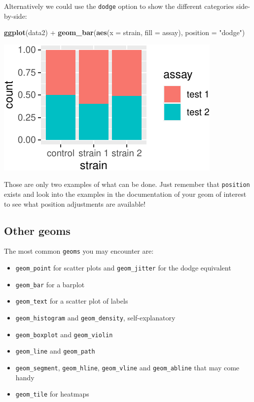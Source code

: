 \documentclass[]{book}
\newenvironment{Shaded}{}{}
\newcommand{\DataTypeTok}[1]{\textcolor[rgb]{0.56,0.13,0.00}{#1}}
\newcommand{\KeywordTok}[1]{\textcolor[rgb]{0.00,0.44,0.13}{\textbf{#1}}}
\newcommand{\NormalTok}[1]{#1}
\newcommand{\OperatorTok}[1]{\textcolor[rgb]{0.40,0.40,0.40}{#1}}
\newcommand{\StringTok}[1]{\textcolor[rgb]{0.25,0.44,0.63}{#1}}
\providecommand{\tightlist}{%
  \setlength{\itemsep}{0pt}\setlength{\parskip}{0pt}}
\begin{document}
Alternatively we could use the \texttt{dodge} option to show the different categories side-by-side:

\begin{Shaded}
\begin{Highlighting}[]
\KeywordTok{ggplot}\NormalTok{(data2) }\OperatorTok{+}
\StringTok{  }\KeywordTok{geom_bar}\NormalTok{(}\KeywordTok{aes}\NormalTok{(}\DataTypeTok{x =}\NormalTok{ strain, }\DataTypeTok{fill =}\NormalTok{ assay), }\DataTypeTok{position =} \StringTok{"dodge"}\NormalTok{)}
\end{Highlighting}
\end{Shaded}

\begin{center}\includegraphics[width=\textwidth]{TRES-Tidy-Tutorial_files/figure-latex/unnamed-chunk-117-1} \end{center}

Those are only two examples of what can be done. Just remember that \texttt{position} exists and look into the examples in the documentation of your geom of interest to see what position adjustments are available!

\hypertarget{other-geoms}{%
\subsection{Other geoms}\label{other-geoms}}

The most common \texttt{geoms} you may encounter are:

\begin{itemize}
\tightlist
\item
  \texttt{geom\_point} for scatter plots and \texttt{geom\_jitter} for the dodge equivalent
\item
  \texttt{geom\_bar} for a barplot
\item
  \texttt{geom\_text} for a scatter plot of labels
\item
  \texttt{geom\_histogram} and \texttt{geom\_density}, self-explanatory
\item
  \texttt{geom\_boxplot} and \texttt{geom\_violin}
\item
  \texttt{geom\_line} and \texttt{geom\_path}
\item
  \texttt{geom\_segment}, \texttt{geom\_hline}, \texttt{geom\_vline} and \texttt{geom\_abline} that may come handy
\item
  \texttt{geom\_tile} for heatmaps
\end{itemize}
\end{document}
